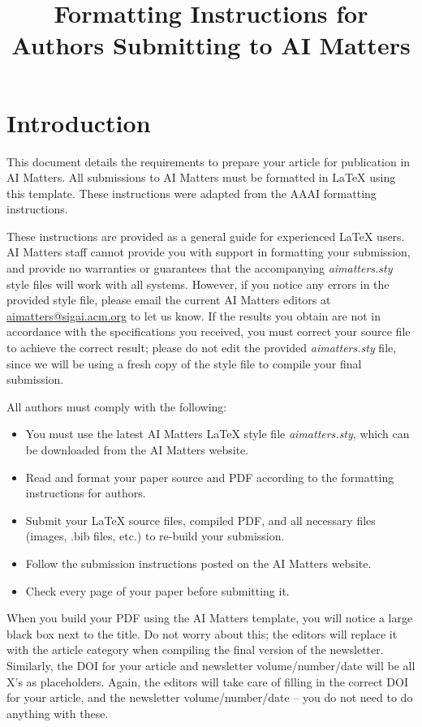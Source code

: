 \documentclass[letterpaper]{article}
\title{Formatting Instructions for Authors Submitting to AI Matters}
\author{
\AIMauthor{AI Matters Editors}{ACM SIGAI}{aimatters@sigai.acm.org}  %
\AIMauthor{Shakey the Robot}{Stanford Research Institute}{shakey@sri.com}
}
\begin{document}
\maketitle
 

\section{Introduction}

This document details the requirements to prepare your article for publication in AI Matters.  All submissions to AI Matters must be formatted in \LaTeX{} using this template.  These instructions were adapted from the AAAI formatting instructions.

These instructions are provided as a general guide for experienced \LaTeX{} users.  AI Matters staff cannot provide you with support in formatting your submission, and provide no warranties or guarantees that the accompanying {\em aimatters.sty} style files will work with all systems.  However, if you notice any errors in the provided style file, please email the current AI Matters editors at \href{mailto:aimatters@sigai.acm.org}{aimatters@sigai.acm.org} to let us know.  If the results you obtain are not in accordance with the specifications you received, you must correct your source file to achieve the correct result; please do not edit the provided {\em aimatters.sty} file, since we will be using a fresh copy of the style file to compile your final submission. 

All authors must comply with the following:

\begin{itemize}
\item You must use the latest AI Matters \LaTeX{} style file {\em aimatters.sty}, which can be downloaded from the AI Matters website.
\item Read and format your paper source and PDF according to the formatting instructions for authors.
\item Submit your \LaTeX{} source files, compiled PDF, and all necessary files (images, .bib files, etc.) to re-build your submission.
\item Follow the submission instructions posted on the AI Matters website.
\item Check every page of your paper before submitting it.
\end{itemize}

When you build your PDF using the AI Matters template, you will notice a large black box next to the title.  Do not worry about this; the editors will replace it with the article category when compiling the final version of the newsletter.  Similarly, the DOI for your article and newsletter volume/number/date will be all X's as placeholders.  Again, the editors will take care of filling in the correct DOI for your article, and the newsletter volume/number/date -- you do not need to do anything with these.
\end{document}
